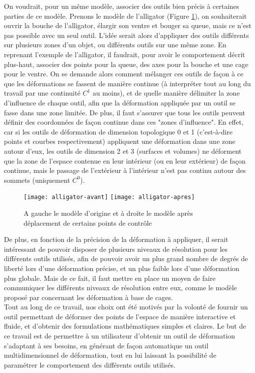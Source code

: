 On voudrait, pour un même modèle, associer des outils bien précis à
certaines parties de ce modèle. Prenons le modèle de l'alligator
(Figure \ref{INTall}), on souhaiterait ouvrir la bouche de
l'alligator, élargir son ventre et bouger sa queue, mais ce n'est pas
possible avec un seul outil. L'idée serait alors d'appliquer des
outils différents sur plusieurs zones d'un objet, ou différents outils
sur une même zone. En reprenant l'exemple de l'alligator, il faudrait,
pour avoir le comportement décrit plus-haut, associer des points pour
la queue, des axes pour la bouche et une cage pour le ventre. On se
demande alors comment mélanger ces outils de façon à ce que les
déformations se fassent de manière continue (à interpréter tout au
long du travail par une continuité $C^1$ au moins), et de quelle
manière délimiter la zone d'influence de chaque outil, afin que la
déformation appliquée par un outil se fasse dans une zone limitée. De
plus, il faut s'assurer que tous les outils peuvent définir des
coordonnées de façon continue dans ces "zones d'influence". En effet,
car si les outils de déformation de dimension topologique 0 et 1
(c'est-à-dire points et courbes respectivement) appliquent une
déformation dans une zone autour d'eux, les outils de dimension 2 et 3
(surfaces et volumes) ne déforment que la zone de l'espace contenue en
leur intérieur (ou en leur extérieur) de façon continue, mais le
passage de l'extérieur à l'intérieur n'est pas continu autour des
sommets (uniquement $C^0$).
\\


\begin{figure}[h]
  \texttt{[image: alligator-avant]}
  \texttt{[image: alligator-apres]}
  \caption{A gauche le modèle d'origine et à droite le modèle après
    déplacement de certains points de contrôle}
  \label{INTall}
\end{figure}

De plus, en fonction de la précision de la déformation à appliquer, il
serait intéressant de pouvoir disposer de plusieurs niveaux de
résolution pour les différents outils utilisés, afin de pouvoir avoir
un plus grand nombre de degrés de liberté lors d'une déformation
précise, et un plus faible lors d'une déformation plus globale. Mais
de ce fait, il faut mettre en place un moyen de faire communiquer les
différents niveaux de résolution entre eux, comme le modèle proposé
par \cite{Hur12} concernant les déformation à base de cages.
\\

Tout au long de ce travail, nos choix ont été motivés par la volonté
de fournir un outil permettant de déformer des points de l'espace de
manière interactive et fluide, et d'obtenir des formulations
mathématiques simples et claires. Le but de ce travail est de
permettre à un utilisateur d'obtenir un outil de déformation
s'adaptant à ses besoins, en générant de façon automatique un outil
multidimensionnel de déformation, tout en lui laissant la possibilité
de paramétrer le comportement des différents outils utilisés.



